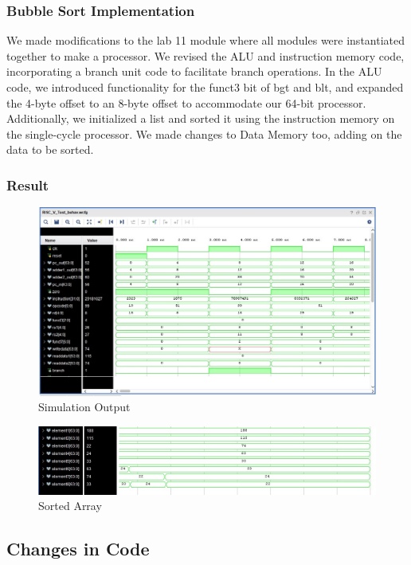 \documentclass{article}
\begin{document}
\subsubsection{Bubble Sort Implementation}
\hspace{1cm} We made modifications to the lab 11 module where all modules were instantiated together to make a processor. We revised the ALU and instruction memory code, incorporating a branch unit code to facilitate branch operations. In the ALU code, we introduced functionality for the funct3 bit of bgt and blt, and expanded the 4-byte offset to an 8-byte offset to accommodate our 64-bit processor. Additionally, we initialized a list and sorted it using the instruction memory on the single-cycle processor. We made changes to Data Memory too, adding on the data to be sorted.
\pagebreak
\subsubsection{Result}
\begin{figure} [ht]
    \centering 
    \includegraphics[width=1\textwidth]{task 1 simulation.jpg} 
    \caption{Simulation Output} 
    \label{fig:Output 1} 
\end{figure}
\begin{figure} 
    \centering 
    \includegraphics[width=1\textwidth]{task 1 sorted array.jpg} 
    \caption{Sorted Array} 
    \label{fig:Array 1} 
\end{figure}
\pagebreak
\subsection{Changes in Code}
\end{document}
